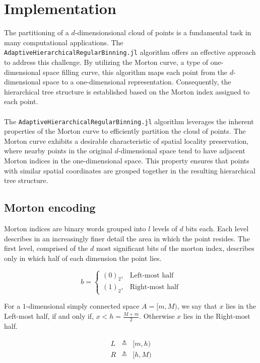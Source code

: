 \documentclass{juliacon}
\begin{document}
\section{Implementation}
The partitioning of a $d$-dimensionsional cloud of points is a fundamental task
in many computational applications. The
\verb|AdaptiveHierarchicalRegularBinning.jl|
algorithm offers an effective approach to address this challenge. By utilizing
the Morton curve, a type of one-dimensional space filling curve, this algorithm
maps each point from the $d$-dimensional space to a one-dimensional
representation. Consequently, the hierarchical tree structure is established
based on the Morton index assigned to each point.
\\\\
The \verb|AdaptiveHierarchicalRegularBinning.jl| algorithm leverages the
inherent properties of the Morton curve to efficiently partition the cloud of
points. The Morton curve exhibits a desirable characteristic of spatial
locality preservation, where nearby points in the original $d$-dimensional
space tend to have adjacent Morton indices in the one-dimensional space. This
property ensures that points with similar spatial coordinates are grouped
together in the resulting hierarchical tree structure.

\subsection{Morton encoding}
Morton indices are binary words grouped into $l$ levels of $d$ bits each. Each level
describes in an increasingly finer detail the area in which the point resides. The
first level, comprised of the $d$ most significant bits of the morton index, describes
only in which half of each dimension the point lies.

$$b = \left\{\begin{matrix}
  (0)_2, & \textrm{Left-most half}  \\
  (1)_2, & \textrm{Right-most half}
\end{matrix}\right.$$


\begin{definition}
  For a $1$-dimensional simply connected space $A = [m, M)$, we say that
  $x$ lies in the Left-most half, if and only if, $x<h=\frac{M+m}{2}$.
  Otherwise $x$ lies in the Right-most half.

  $$
  \begin{matrix}
    L &\triangleq& [m, h) \\
    R &\triangleq& [h, M)
  \end{matrix}
  $$
\end{definition}
\end{document}
